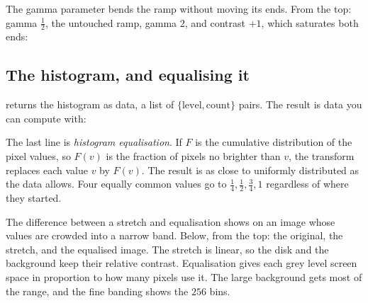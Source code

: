The gamma parameter bends the ramp without moving its ends. From the top: gamma
\(\tfrac12\), the untouched ramp, gamma \(2\), and contrast \(+1\), which
saturates both ends:


\subsection{The histogram, and equalising it}

 returns the histogram as data, a list of \(\{\text{level},
\text{count}\}\) pairs. The result is data you can compute with:

\begin{codepairs}
\end{codepairs}

The last line is \emph{histogram equalisation}. If
\(F\) is the cumulative distribution of the pixel values, so \(F(v)\) is the
fraction of pixels no brighter than \(v\), the transform replaces each value \(v\)
by \(F(v)\). The result is as close to uniformly distributed as the data allows.
Four equally common values go to \(\tfrac14, \tfrac12, \tfrac34, 1\) regardless of
where they started.

The difference between a stretch and equalisation shows on an image whose values
are crowded into a narrow band. Below, from the top: the original, the stretch,
and the equalised image. The stretch is linear, so the disk and the background
keep their relative contrast. Equalisation gives each grey level screen space in
proportion to how many pixels use it. The large background gets most of the
range, and the fine banding shows the \(256\) bins.



